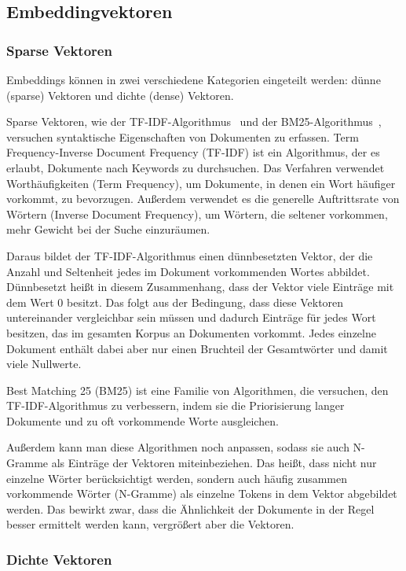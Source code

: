 \subsection{Embeddingvektoren}

\subsubsection{Sparse Vektoren}

Embeddings können in zwei verschiedene Kategorien eingeteilt werden: dünne (sparse) Vektoren und dichte (dense) Vektoren.

Sparse Vektoren, wie der TF-IDF-Algorithmus~\cite{sparckjones1972} und der BM25-Algorithmus~\cite{harman1995}, versuchen syntaktische Eigenschaften von Dokumenten zu erfassen.
Term Frequency-Inverse Document Frequency (TF-IDF) ist ein Algorithmus, der es erlaubt, Dokumente nach Keywords zu durchsuchen.
Das Verfahren verwendet Worthäufigkeiten (Term Frequency), um Dokumente, in denen ein Wort häufiger vorkommt, zu bevorzugen.
Außerdem verwendet es die generelle Auftrittsrate von Wörtern (Inverse Document Frequency), um Wörtern, die seltener vorkommen, mehr Gewicht bei der Suche einzuräumen.

Daraus bildet der TF-IDF-Algorithmus einen dünnbesetzten Vektor, der die Anzahl und Seltenheit jedes im Dokument vorkommenden Wortes abbildet.
Dünnbesetzt heißt in diesem Zusammenhang, dass der Vektor viele Einträge mit dem Wert 0 besitzt.
Das folgt aus der Bedingung, dass diese Vektoren untereinander vergleichbar sein müssen und dadurch Einträge für jedes Wort besitzen, das im gesamten Korpus an Dokumenten vorkommt.
Jedes einzelne Dokument enthält dabei aber nur einen Bruchteil der Gesamtwörter und damit viele Nullwerte.~\cite{sparckjones1972} 

Best Matching 25 (BM25) ist eine Familie von Algorithmen, die versuchen, den TF-IDF-Algorithmus zu verbessern, indem sie die Priorisierung langer Dokumente und zu oft vorkommende Worte ausgleichen.~\cite{harman1995}

Außerdem kann man diese Algorithmen noch anpassen, sodass sie auch N-Gramme als Einträge der Vektoren miteinbeziehen.
Das heißt, dass nicht nur einzelne Wörter berücksichtigt werden, sondern auch häufig zusammen vorkommende Wörter (N-Gramme) als einzelne Tokens in dem Vektor abgebildet werden.
Das bewirkt zwar, dass die Ähnlichkeit der Dokumente in der Regel besser ermittelt werden kann, vergrößert aber die Vektoren.~\cite{dey2017}

\subsubsection{Dichte Vektoren}

